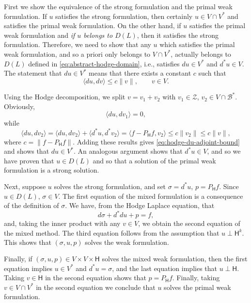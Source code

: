 \begin{Proof}
{First we show the equivalence of the strong formulation and the primal weak formulation. If $u$ satisfies the strong formulation, then certainly $u\in V\cap V^*$ and satisfies the primal weak formulation. On the other hand, if $u$ satisfies the primal weak formulation and \emph{if $u$ belongs to $D(L)$}, then it satisfies the strong formulation. Therefore, we need to show that any $u$ which satisfies the primal weak formulation, and so a priori only belongs to $V\cap V^*$, actually belongs to $D(L)$ defined in \eqref{eq:abstract-hodge-domain}, i.e., satisfies $du\in V^*$ and $d^*u\in V$. The statement that $du\in V^*$ means that there exists a constant $c$ such that}
\begin{equation}\label{eq:hodge-du-adjoint-bound}
\langle du,dv\rangle\leq c\|v\|,\qquad v\in V.
\end{equation}

{Using the Hodge decomposition, we split $v=v_1+v_2$ with $v_1\in\mathcal Z$, $v_2\in V\cap\mathcal B^*$. Obviously,}
\[
\langle du,dv_1\rangle=0,
\]
{while}
\[
\langle du,dv_2\rangle=\langle du,dv_2\rangle+\langle d^*u,d^*v_2\rangle=\langle f-P_{\mathsf H}f,v_2\rangle\leq c\|v_2\|\leq c\|v\|,
\]
{where $c=\|f-P_{\mathsf H}f\|$. Adding these results gives \eqref{eq:hodge-du-adjoint-bound} and shows that $du\in V^*$. An analogous argument shows that $d^*u\in V$, and so we have proven that $u\in D(L)$ and so that a solution of the primal weak formulation is a strong solution.}

{Next, suppose $u$ solves the strong formulation, and set $\sigma=d^*u$, $p=P_{\mathsf H}f$. Since $u\in D(L)$, $\sigma\in V$. The first equation of the mixed formulation is a consequence of the definition of $\sigma$. We have, from the Hodge Laplace equation, that}
\[
d\sigma+d^*du+p=f,
\]
{and, taking the inner product with any $v\in V$, we obtain the second equation of the mixed method. The third equation follows from the assumption that $u\perp\mathsf H^k$. This shows that $(\sigma,u,p)$ solves the weak formulation.}

{Finally, if $(\sigma,u,p)\in V\times V\times\mathsf H$ solves the mixed weak formulation, then the first equation implies $u\in V^*$ and $d^*u=\sigma$, and the last equation implies that $u\perp\mathsf H$. Taking $v\in\mathsf H$ in the second equation shows that $p=P_{\mathsf H}f$. Finally, taking $v\in V\cap V^*$ in the second equation we conclude that $u$ solves the primal weak formulation.}
\end{Proof}

